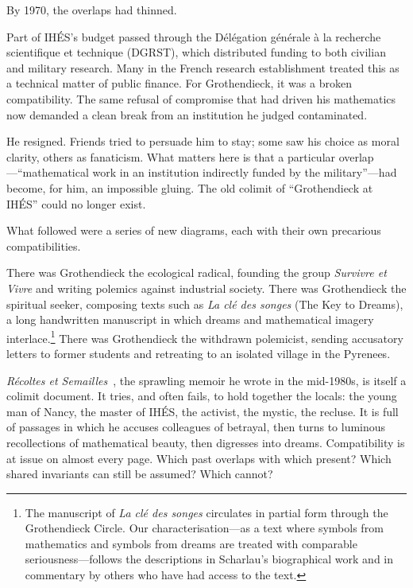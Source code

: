 \documentclass[12pt,a4paper]{article}
\begin{document}
By 1970, the overlaps had thinned.

Part of IH\'ES's budget passed through the D\'el\'egation g\'en\'erale \`a la recherche scientifique et technique (DGRST), which distributed funding to both civilian and military research. Many in the French research establishment treated this as a technical matter of public finance. For Grothendieck, it was a broken compatibility. The same refusal of compromise that had driven his mathematics now demanded a clean break from an institution he judged contaminated.

He resigned. Friends tried to persuade him to stay; some saw his choice as moral clarity, others as fanaticism. What matters here is that a particular overlap---``mathematical work in an institution indirectly funded by the military''---had become, for him, an impossible gluing. The old colimit of ``Grothendieck at IH\'ES'' could no longer exist.

What followed were a series of new diagrams, each with their own precarious compatibilities.

There was Grothendieck the ecological radical, founding the group \emph{Survivre et Vivre} and writing polemics against industrial society. There was Grothendieck the spiritual seeker, composing texts such as \emph{La cl\'e des songes} (The Key to Dreams), a long handwritten manuscript in which dreams and mathematical imagery interlace.\footnote{The manuscript of \emph{La cl\'e des songes} circulates in partial form through the Grothendieck Circle. Our characterisation---as a text where symbols from mathematics and symbols from dreams are treated with comparable seriousness---follows the descriptions in Scharlau's biographical work and in commentary by others who have had access to the text.} There was Grothendieck the withdrawn polemicist, sending accusatory letters to former students and retreating to an isolated village in the Pyrenees.

\emph{R\'ecoltes et Semailles}~\cite{grothendieck_res}, the sprawling memoir he wrote in the mid-1980s, is itself a colimit document. It tries, and often fails, to hold together the locals: the young man of Nancy, the master of IH\'ES, the activist, the mystic, the recluse. It is full of passages in which he accuses colleagues of betrayal, then turns to luminous recollections of mathematical beauty, then digresses into dreams. Compatibility is at issue on almost every page. Which past overlaps with which present? Which shared invariants can still be assumed? Which cannot?
\end{document}
